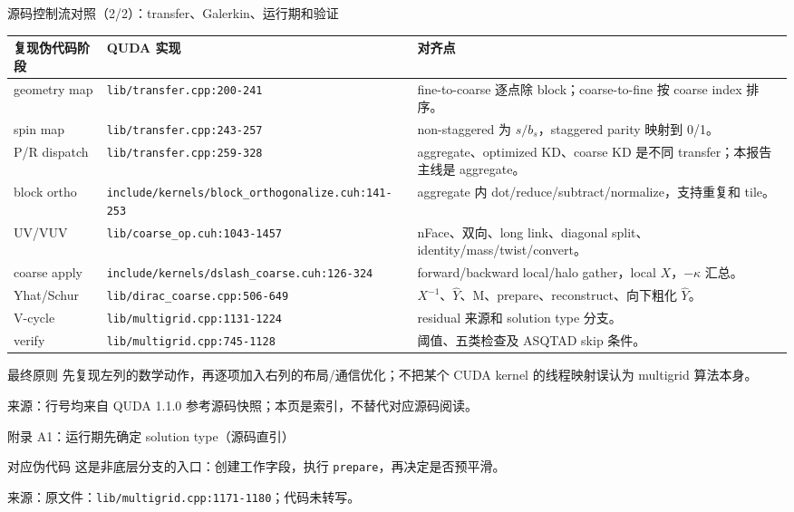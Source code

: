 \documentclass[UTF8,aspectratio=169,11pt]{ctexbeamer}
\newcommand{\source}[1]{\vspace{0.05em}\par{\raggedright\scriptsize\color{muted}来源：#1\par}}
\newcommand{\codepath}[1]{\nolinkurl{#1}}
\begin{document}
\begin{frame}[t]{源码控制流对照（2/2）：transfer、Galerkin、运行期和验证}
  \scriptsize
  \begin{tabularx}{\textwidth}{@{}l l X@{}}
    \toprule
    复现伪代码阶段 & QUDA 实现 & 对齐点 \\
    \midrule
    geometry map & \codepath{lib/transfer.cpp:200-241} & fine-to-coarse 逐点除 block；coarse-to-fine 按 coarse index 排序。 \\
    spin map & \codepath{lib/transfer.cpp:243-257} & non-staggered 为 \(s/b_s\)，staggered parity 映射到 0/1。 \\
    P/R dispatch & \codepath{lib/transfer.cpp:259-328} & aggregate、optimized KD、coarse KD 是不同 transfer；本报告主线是 aggregate。 \\
    block ortho & \codepath{include/kernels/block_orthogonalize.cuh:141-253} & aggregate 内 dot/reduce/subtract/normalize，支持重复和 tile。 \\
    UV/VUV & \codepath{lib/coarse_op.cuh:1043-1457} & nFace、双向、long link、diagonal split、identity/mass/twist/convert。 \\
    coarse apply & \codepath{include/kernels/dslash_coarse.cuh:126-324} & forward/backward local/halo gather，local \(X\)，\(-\kappa\) 汇总。 \\
    Yhat/Schur & \codepath{lib/dirac_coarse.cpp:506-649} & \(X^{-1}\)、\(\widehat Y\)、M、prepare、reconstruct、向下粗化 \(\widehat Y\)。 \\
    V-cycle & \codepath{lib/multigrid.cpp:1131-1224} & residual 来源和 solution type 分支。 \\
    verify & \codepath{lib/multigrid.cpp:745-1128} & 阈值、五类检查及 ASQTAD skip 条件。 \\
    \bottomrule
  \end{tabularx}
  \vspace{0.12cm}
  \begin{alertblock}{最终原则}
    先复现左列的数学动作，再逐项加入右列的布局/通信优化；不把某个 CUDA kernel 的线程映射误认为 multigrid 算法本身。
  \end{alertblock}
  \source{行号均来自 QUDA 1.1.0 参考源码快照；本页是索引，不替代对应源码阅读。}
\end{frame}

\appendix

\begin{frame}[fragile,t]{附录 A1：运行期先确定 solution type（源码直引）}
  
  \begin{block}{对应伪代码}
    这是非底层分支的入口：创建工作字段，执行 \texttt{prepare}，再决定是否预平滑。
  \end{block}
  \source{原文件：\codepath{lib/multigrid.cpp:1171-1180}；代码未转写。}
\end{frame}
\end{document}
